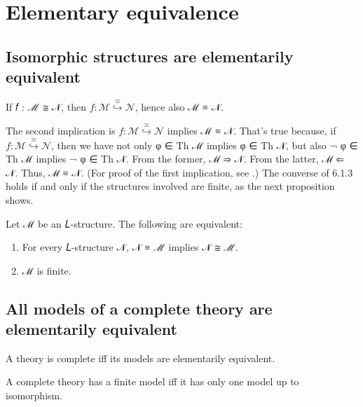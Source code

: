 \documentclass[a4paper,UKenglish,cleveref,autoref,thm-restate,12pt]{lipics-v2021-wjd}
\newcommand{\<}{\langle}
\renewcommand{\>}{\rangle}
\begin{document}
\section{Elementary equivalence}\label{elementary-equivalence}
\subsection{Isomorphic structures are elementarily equivalent}\label{isomorphic-structures-are-elementarily-equivalent}
\begin{lemma}
If 𝑓 : ℳ ≅ 𝒩, then \(𝑓 : ℳ \stackrel{≡}{↪} 𝒩\), hence also ℳ ≡ 𝒩.
\end{lemma}
The second implication is \(𝑓 : ℳ \stackrel{≡}{↪} 𝒩\) implies ℳ ≡ 𝒩. 
That's true because, if \(𝑓 : ℳ \stackrel{≡}{↪} 𝒩\), then we have not only
φ ∈ Th ℳ implies φ ∈ Th 𝒩, but also ¬ φ ∈ Th ℳ implies ¬ φ ∈ Th 𝒩. From the
former, ℳ ⇒ 𝒩. From the latter, ℳ ⇐ 𝒩. Thus, ℳ ≡ 𝒩.
(For proof of the first implication, see \cite[page 70]{Rothmaler:2000}.)
The converse of 6.1.3 holds if and only if the structures involved are
finite, as the next proposition shows.

\begin{lemma}
Let ℳ be an 𝐿-structure. The following are equivalent:
\begin{enumerate}
\item For every 𝐿-structure 𝒩, 𝒩 ≡ ℳ implies 𝒩 ≅ ℳ.
\item ℳ is finite.
\end{enumerate}
\end{lemma}

\subsection{All models of a complete theory are elementarily equivalent}\label{all-models-of-a-complete-theory-are-elementarily-equivalent}

\begin{lemma}
 A theory is complete iff its models are elementarily equivalent.
\end{lemma}

\begin{corollary}
 A complete theory has a finite model iff it has only one model up to isomorphism.
\end{corollary}
\end{document}
